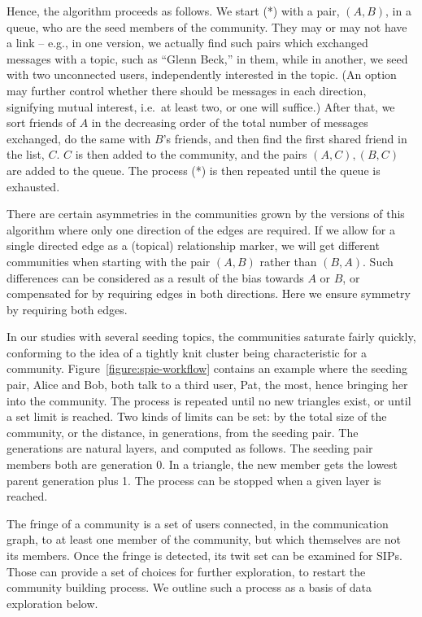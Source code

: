 \documentclass[10pt,oneside]{memoir}
\begin{document}
Hence, the algorithm proceeds as follows. We start (*) with a
pair, $(A,B)$, in a queue, who are the seed members of the
community. They may or may not have a link -- e.g., in one version,
we actually find such pairs which exchanged messages with a topic,
such as ``Glenn Beck,'' in them, while in another, we seed with two
unconnected users, independently interested in the topic. (An
option may further control whether there should be messages in each
direction, signifying mutual interest, i.e.\ at least two, or one
will suffice.) After that, we sort friends of $A$ in the decreasing
order of the total number of messages exchanged, do the same with
$B$'s friends, and then find the first shared friend in the list,
$C$. $C$ is then added to the community, and the pairs
$(A,C), (B,C)$ are added to the queue. The process (*) is then
repeated until the queue is exhausted.


There are certain asymmetries in the communities grown by the
versions of this algorithm where only one direction of the edges
are required. If we allow for a single directed edge as a (topical)
relationship marker, we will get different communities when
starting with the pair $(A,B)$ rather than $(B,A)$. Such
differences can be considered as a result of the bias towards $A$
or $B$, or compensated for by requiring edges in both directions.
Here we ensure symmetry by requiring both edges.


In our studies with several seeding topics, the communities
saturate fairly quickly, conforming to the idea of a tightly knit
cluster \cite{DBLP:conf/waw/MishraSST07} being characteristic for a
community. Figure~\ref{figure:spie-workflow} contains an example where the
seeding pair, Alice and Bob, both talk to a third user, Pat, the
most, hence bringing her into the community. The process is
repeated until no new triangles exist, or until a set limit is
reached. Two kinds of limits can be set: by the total size of the
community, or the distance, in generations, from the seeding pair.
The generations are natural layers, and computed as follows. The
seeding pair members both are generation 0. In a triangle, the new
member gets the lowest parent generation plus 1. The process can be
stopped when a given layer is reached.


The fringe of a community is a set of users connected, in the
communication graph, to at least one member of the community, but
which themselves are not its members. Once the fringe is detected,
its twit set can be examined for SIPs. Those can provide a set of
choices for further exploration, to restart the community building
process. We outline such a process as a basis of data exploration
below.
\end{document}
